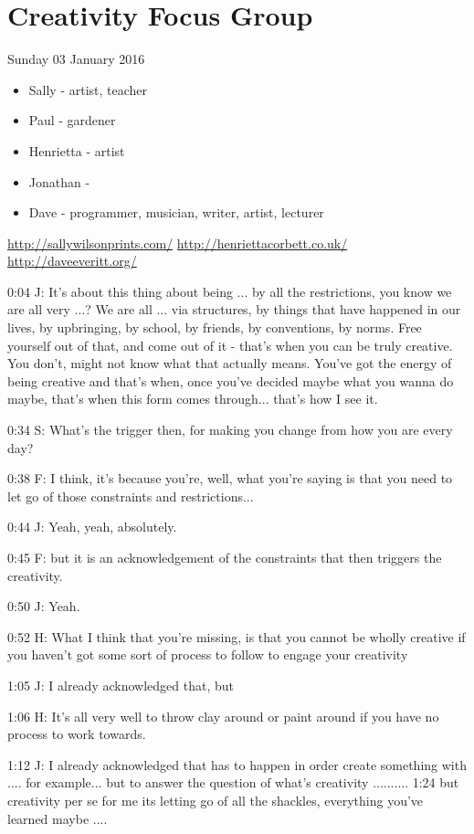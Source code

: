 \section{Creativity Focus Group}

Sunday 03 January 2016

\begin{itemize}
  \item Sally - artist, teacher
  \item Paul - gardener
  \item Henrietta - artist
  \item Jonathan -
  \item Dave - programmer, musician, writer, artist, lecturer
\end{itemize}

\url{http://sallywilsonprints.com/}
\url{http://henriettacorbett.co.uk/}
\url{http://daveeveritt.org/}

0:04 J: It's about this thing about being ... by all the restrictions, you know we are all very ...? We are all ... via structures, by things that have happened in our lives, by upbringing, by school, by friends, by conventions, by norms. Free yourself out of that, and come out of it - that's when you can be truly creative. You don't, might not know what that actually means. You've got the energy of being creative and that's when, once you've decided maybe what you wanna do maybe, that's when this form comes through... that's how I see it.

0:34 S: What's the trigger then, for making you change from how you are every day?

0:38 F: I think, it's because you're, well, what you're saying is that you need to let go of those constraints and restrictions...

0:44 J: Yeah, yeah, absolutely.

0:45 F: but it is an acknowledgement of the constraints that then triggers the creativity.

0:50 J: Yeah.

0:52 H: What I think that you're missing, is that you cannot be wholly creative if you haven't got some sort of process to follow to engage your creativity

1:05 J: I already acknowledged that, but

1:06 H: It's all very well to throw clay around or paint around if you have no process to work towards.

1:12 J: I already acknowledged that has to happen in order create something with .... for example... but to answer the question of what's creativity .......... 1:24 but creativity per se for me its letting go of all the shackles, everything you've learned maybe ....

